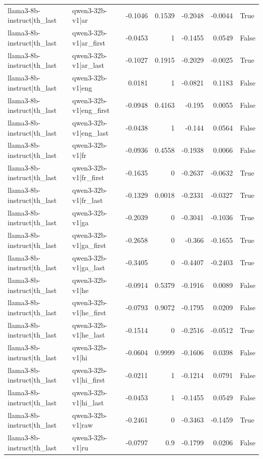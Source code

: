 \begin{table}
\begin{tabular}{l l r r r r l}
llama3-8b-instruct|th_last & qwen3-32b-v1|ar & -0.1046 & 0.1539 & -0.2048 & -0.0044 & True \\
llama3-8b-instruct|th_last & qwen3-32b-v1|ar_first & -0.0453 & 1 & -0.1455 & 0.0549 & False \\
llama3-8b-instruct|th_last & qwen3-32b-v1|ar_last & -0.1027 & 0.1915 & -0.2029 & -0.0025 & True \\
llama3-8b-instruct|th_last & qwen3-32b-v1|eng & 0.0181 & 1 & -0.0821 & 0.1183 & False \\
llama3-8b-instruct|th_last & qwen3-32b-v1|eng_first & -0.0948 & 0.4163 & -0.195 & 0.0055 & False \\
llama3-8b-instruct|th_last & qwen3-32b-v1|eng_last & -0.0438 & 1 & -0.144 & 0.0564 & False \\
llama3-8b-instruct|th_last & qwen3-32b-v1|fr & -0.0936 & 0.4558 & -0.1938 & 0.0066 & False \\
llama3-8b-instruct|th_last & qwen3-32b-v1|fr_first & -0.1635 & 0 & -0.2637 & -0.0632 & True \\
llama3-8b-instruct|th_last & qwen3-32b-v1|fr_last & -0.1329 & 0.0018 & -0.2331 & -0.0327 & True \\
llama3-8b-instruct|th_last & qwen3-32b-v1|ga & -0.2039 & 0 & -0.3041 & -0.1036 & True \\
llama3-8b-instruct|th_last & qwen3-32b-v1|ga_first & -0.2658 & 0 & -0.366 & -0.1655 & True \\
llama3-8b-instruct|th_last & qwen3-32b-v1|ga_last & -0.3405 & 0 & -0.4407 & -0.2403 & True \\
llama3-8b-instruct|th_last & qwen3-32b-v1|he & -0.0914 & 0.5379 & -0.1916 & 0.0089 & False \\
llama3-8b-instruct|th_last & qwen3-32b-v1|he_first & -0.0793 & 0.9072 & -0.1795 & 0.0209 & False \\
llama3-8b-instruct|th_last & qwen3-32b-v1|he_last & -0.1514 & 0 & -0.2516 & -0.0512 & True \\
llama3-8b-instruct|th_last & qwen3-32b-v1|hi & -0.0604 & 0.9999 & -0.1606 & 0.0398 & False \\
llama3-8b-instruct|th_last & qwen3-32b-v1|hi_first & -0.0211 & 1 & -0.1214 & 0.0791 & False \\
llama3-8b-instruct|th_last & qwen3-32b-v1|hi_last & -0.0453 & 1 & -0.1455 & 0.0549 & False \\
llama3-8b-instruct|th_last & qwen3-32b-v1|raw & -0.2461 & 0 & -0.3463 & -0.1459 & True \\
llama3-8b-instruct|th_last & qwen3-32b-v1|ru & -0.0797 & 0.9 & -0.1799 & 0.0206 & False \\

\end{tabular}
\end{table}
